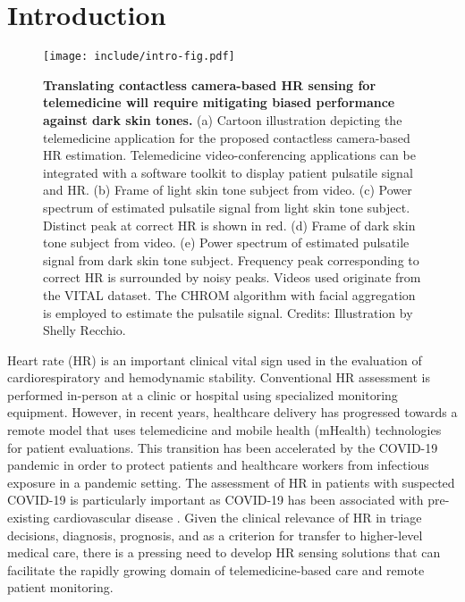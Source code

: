 %
%

\chapter{Introduction} \label{chap:intro}

\begin{figure}
    \centering
    \texttt{[image: include/intro-fig.pdf]}
    \caption{\textbf{Translating contactless camera-based HR sensing for telemedicine will require mitigating biased performance against dark skin tones.} (a) Cartoon illustration depicting the telemedicine application for the proposed contactless camera-based HR estimation. Telemedicine video-conferencing applications can be integrated with a software toolkit to display patient pulsatile signal and HR. (b) Frame of light skin tone subject from video. (c) Power spectrum of estimated pulsatile signal from light skin tone subject. Distinct peak at correct HR is shown in red. (d) Frame of dark skin tone subject from video. (e) Power spectrum of estimated pulsatile signal from dark skin tone subject. Frequency peak corresponding to correct HR is surrounded by noisy peaks. Videos used originate from the VITAL dataset. The CHROM algorithm with facial aggregation is employed to estimate the pulsatile signal. Credits: Illustration by Shelly Recchio.}
    \label{fig:teaser}
\end{figure}

Heart rate (HR) is an important clinical vital sign used in the evaluation of cardiorespiratory and hemodynamic stability. Conventional HR assessment is performed in-person at a clinic or hospital using specialized monitoring equipment. However, in recent years, healthcare delivery has progressed towards a remote model that uses telemedicine and mobile health (mHealth) technologies for patient evaluations. This transition has been accelerated by the COVID-19 pandemic \cite{annis_rapid_2020,ford_leveraging_2020,connolly_rapid_2020} in order to protect patients and healthcare workers from infectious exposure in a pandemic setting. The assessment of HR in patients with suspected COVID-19 is particularly important as COVID-19 has been associated with pre-existing cardiovascular disease \cite{nishiga_covid-19_2020}. Given the clinical relevance of HR in triage decisions, diagnosis, prognosis, and as a criterion for transfer to higher-level medical care, there is a pressing need to develop HR sensing solutions that can facilitate the rapidly growing domain of telemedicine-based care and remote patient monitoring.

